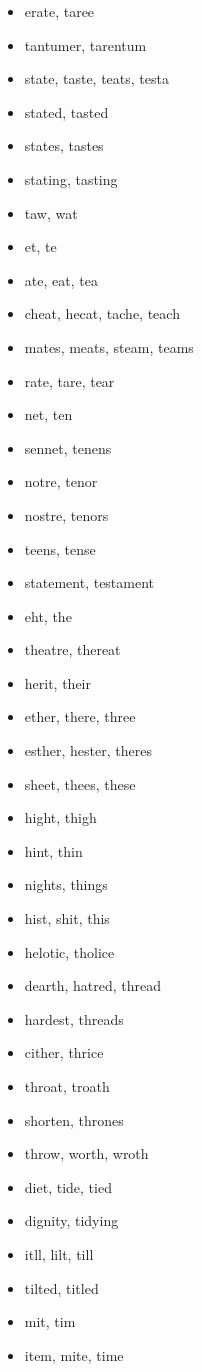 \documentclass[a4wide,11pt]{report}
\begin{document}
\begin{itemize}
  \item erate, taree
  \item tantumer, tarentum
  \item state, taste, teats, testa
  \item stated, tasted
  \item states, tastes
  \item stating, tasting
  \item taw, wat
  \item et, te
  \item ate, eat, tea
  \item cheat, hecat, tache, teach
  \item mates, meats, steam, teams
  \item rate, tare, tear
  \item net, ten
  \item sennet, tenens
  \item notre, tenor
  \item nostre, tenors
  \item teens, tense
  \item statement, testament
  \item eht, the
  \item theatre, thereat
  \item herit, their
  \item ether, there, three
  \item esther, hester, theres
  \item sheet, thees, these
  \item hight, thigh
  \item hint, thin
  \item nights, things
  \item hist, shit, this
  \item helotic, tholice
  \item dearth, hatred, thread
  \item hardest, threads
  \item cither, thrice
  \item throat, troath
  \item shorten, thrones
  \item throw, worth, wroth
  \item diet, tide, tied
  \item dignity, tidying
  \item itll, lilt, till
  \item tilted, titled
  \item mit, tim
  \item item, mite, time

\end{itemize}
\end{document}
